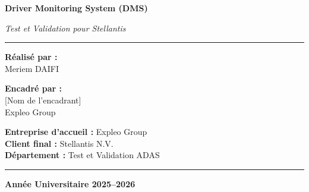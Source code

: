 \begin{titlepage}
\begin{center}
\vspace{0.3cm}

{\LARGE \textcolor{expleored}{\textbf{Driver Monitoring System (DMS)}}}

\vspace{0.3cm}

{\large \textit{Test et Validation pour Stellantis}}

\vspace{0.5cm}

\rule{0.8\textwidth}{0.5pt}

\vspace{1.2cm}

\begin{minipage}{0.45\textwidth}
\begin{flushleft}
{\large \textbf{Réalisé par :}}\\[0.3cm]
{\Large Meriem DAIFI}
\end{flushleft}
\end{minipage}
\hfill
\begin{minipage}{0.45\textwidth}
\begin{flushright}
{\large \textbf{Encadré par :}}\\[0.3cm]
{\Large [Nom de l'encadrant]}\\[0.2cm]
{\normalsize Expleo Group}
\end{flushright}
\end{minipage}

\vspace{1cm}

\begin{minipage}{0.9\textwidth}
\centering
{\large \textbf{Entreprise d'accueil :} Expleo Group}\\[0.2cm]
{\large \textbf{Client final :} Stellantis N.V.}\\[0.2cm]
{\large \textbf{Département :} Test et Validation ADAS}
\end{minipage}

\vspace{1.5cm}

\rule{\textwidth}{1.5pt}

\vspace{0.3cm}

{\Large \textbf{Année Universitaire 2025--2026}}

\end{center}
\end{titlepage}

\newpage
\thispagestyle{empty}
\mbox{}
\newpage
